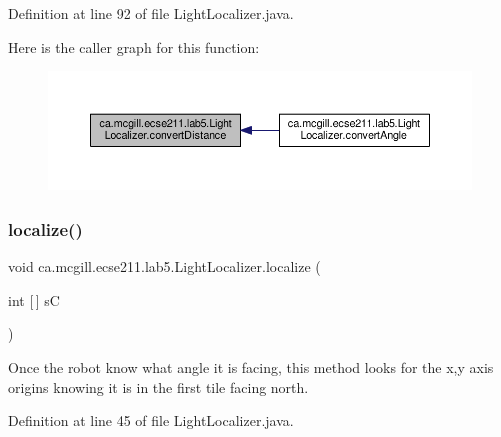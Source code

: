 Definition at line 92 of file Light\+Localizer.\+java.

Here is the caller graph for this function\+:
\nopagebreak
\begin{figure}[H]
\begin{center}
\leavevmode
\includegraphics[width=350pt]{classca_1_1mcgill_1_1ecse211_1_1lab5_1_1_light_localizer_a9eebe889aa2d4d2e881f413cc727cd9c_icgraph}
\end{center}
\end{figure}
\mbox{\label{classca_1_1mcgill_1_1ecse211_1_1lab5_1_1_light_localizer_a441f56a899fae5bc9c1d6a6d25fbe0bb}} 
\subsubsection{\texorpdfstring{localize()}{localize()}}
{\footnotesize\ttfamily void ca.\+mcgill.\+ecse211.\+lab5.\+Light\+Localizer.\+localize (\begin{DoxyParamCaption}\item[{int \mbox{[}$\,$\mbox{]}}]{sC }\end{DoxyParamCaption})}

Once the robot know what angle it is facing, this method looks for the x,y axis origins knowing it is in the first tile facing north. 

Definition at line 45 of file Light\+Localizer.\+java.

